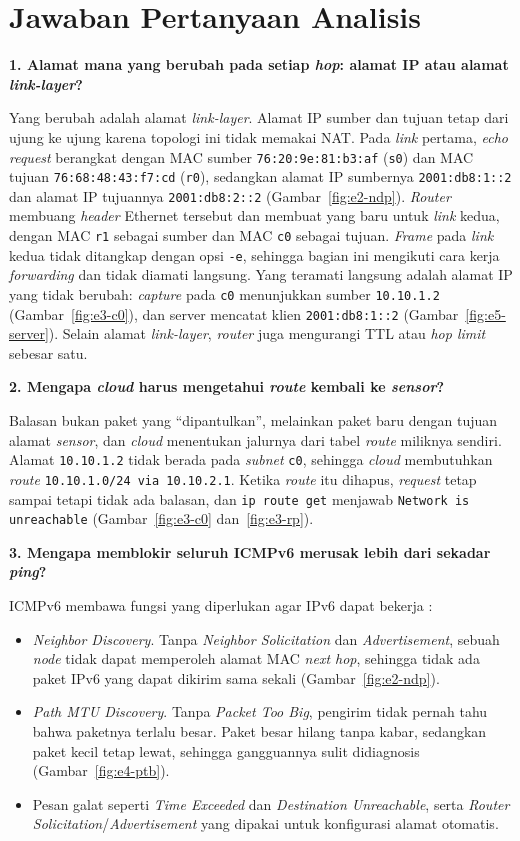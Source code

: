 \documentclass[12pt,a4paper]{report}
\newcommand{\kode}[1]{\texttt{\small #1}}
\begin{document}
\section{Jawaban Pertanyaan Analisis}

\textbf{1. Alamat mana yang berubah pada setiap \emph{hop}: alamat IP atau alamat \emph{link-layer}?}

Yang berubah adalah alamat \emph{link-layer}. Alamat IP sumber dan tujuan tetap dari ujung ke ujung karena topologi ini tidak memakai NAT. Pada \emph{link} pertama, \emph{echo request} berangkat dengan MAC sumber \kode{76:20:9e:81:b3:af} (\kode{s0}) dan MAC tujuan \kode{76:68:48:43:f7:cd} (\kode{r0}), sedangkan alamat IP sumbernya \kode{2001:db8:1::2} dan alamat IP tujuannya \kode{2001:db8:2::2} (Gambar~\ref{fig:e2-ndp}). \emph{Router} membuang \emph{header} Ethernet tersebut dan membuat yang baru untuk \emph{link} kedua, dengan MAC \kode{r1} sebagai sumber dan MAC \kode{c0} sebagai tujuan. \emph{Frame} pada \emph{link} kedua tidak ditangkap dengan opsi \kode{-e}, sehingga bagian ini mengikuti cara kerja \emph{forwarding} dan tidak diamati langsung. Yang teramati langsung adalah alamat IP yang tidak berubah: \emph{capture} pada \kode{c0} menunjukkan sumber \kode{10.10.1.2} (Gambar~\ref{fig:e3-c0}), dan server mencatat klien \kode{2001:db8:1::2} (Gambar~\ref{fig:e5-server}). Selain alamat \emph{link-layer}, \emph{router} juga mengurangi TTL atau \emph{hop limit} sebesar satu.

\textbf{2. Mengapa \emph{cloud} harus mengetahui \emph{route} kembali ke \emph{sensor}?}

Balasan bukan paket yang ``dipantulkan'', melainkan paket baru dengan tujuan alamat \emph{sensor}, dan \emph{cloud} menentukan jalurnya dari tabel \emph{route} miliknya sendiri. Alamat \kode{10.10.1.2} tidak berada pada \emph{subnet} \kode{c0}, sehingga \emph{cloud} membutuhkan \emph{route} \kode{10.10.1.0/24 via 10.10.2.1}. Ketika \emph{route} itu dihapus, \emph{request} tetap sampai tetapi tidak ada balasan, dan \kode{ip route get} menjawab \kode{Network is unreachable} (Gambar~\ref{fig:e3-c0} dan~\ref{fig:e3-rp}).

\textbf{3. Mengapa memblokir seluruh ICMPv6 merusak lebih dari sekadar \emph{ping}?}

ICMPv6 membawa fungsi yang diperlukan agar IPv6 dapat bekerja \cite{rfc4890}:
\begin{itemize}
    \item \emph{Neighbor Discovery}. Tanpa \emph{Neighbor Solicitation} dan \emph{Advertisement}, sebuah \emph{node} tidak dapat memperoleh alamat MAC \emph{next hop}, sehingga tidak ada paket IPv6 yang dapat dikirim sama sekali (Gambar~\ref{fig:e2-ndp}).
    \item \emph{Path MTU Discovery}. Tanpa \emph{Packet Too Big}, pengirim tidak pernah tahu bahwa paketnya terlalu besar. Paket besar hilang tanpa kabar, sedangkan paket kecil tetap lewat, sehingga gangguannya sulit didiagnosis (Gambar~\ref{fig:e4-ptb}).
    \item Pesan galat seperti \emph{Time Exceeded} dan \emph{Destination Unreachable}, serta \emph{Router Solicitation}/\emph{Advertisement} yang dipakai untuk konfigurasi alamat otomatis.
\end{itemize}
\end{document}
